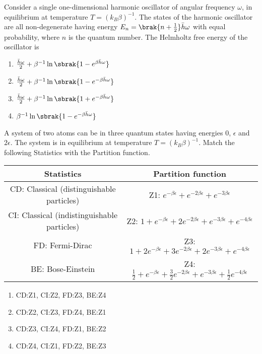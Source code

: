 \item Consider a single one-dimensional harmonic oscillator of angular frequency $\omega$, in  equilibrium at temperature $T=(k_B\beta)^{-1}$. The states of the harmonic oscillator are all non-degenerate having energy $E_n=\brak{n+\frac{1}{2}}\bar{h}\omega$ with equal probability, where $n$ is the quantum number. The Helmholtz free energy of the oscillator is

\begin{enumerate}
\item $\frac{\bar{h}\omega}{2}+\beta^{-1}\ln{\sbrak{1-e^{\beta\bar{h}\omega}}}$
\item $\frac{\bar{h}\omega}{2}+\beta^{-1}\ln{\sbrak{1-e^{-\beta\bar{h}\omega}}}$
\item $\frac{\bar{h}\omega}{2}+\beta^{-1}\ln{\sbrak{1+e^{-\beta\bar{h}\omega}}}$
\item $\beta^{-1}\ln{\sbrak{1-e^{-\beta\bar{h}\omega}}}$
\end{enumerate}

\item A system of two atoms can be in three quantum states having energies $0$, $\epsilon$ and $2\epsilon$. The system is in equilibrium at temperature $T=(k_B\beta)^{-1}$. Match the following Statistics with the Partition function.

\begin{tabular}[12pt]{ |c| c|}
    \hline
    \textbf{Statistics} & \textbf{Partition function}\\ 
    \hline
    CD: Classical (distinguishable particles) & Z1: $e^{-\beta\epsilon}+e^{-2\beta\epsilon}+e^{-3\beta\epsilon}$ \\
    \hline 
    CI: Classical (indistinguishable particles) & Z2: $1+e^{-\beta\epsilon}+2e^{-2\beta\epsilon}+e^{-3\beta\epsilon}+e^{-4\beta\epsilon}$ \\
    \hline
    FD: Fermi-Dirac & Z3: $1+2e^{-\beta\epsilon}+3e^{-2\beta\epsilon}+2e^{-3\beta\epsilon}+e^{-4\beta\epsilon}$ \\
    \hline 
    BE: Bose-Einstein & Z4: $\frac{1}{2}+e^{-\beta\epsilon}+\frac{3}{2}e^{-2\beta\epsilon}+e^{-3\beta\epsilon}+\frac{1}{2}e^{-4\beta\epsilon}$ \\
    \hline
\end{tabular}

\begin{enumerate}
\item CD:Z1, CI:Z2, FD:Z3, BE:Z4
\item CD:Z2, CI:Z3, FD:Z4, BE:Z1
\item CD:Z3, CI:Z4, FD:Z1, BE:Z2
\item CD:Z4, CI:Z1, FD:Z2, BE:Z3
\end{enumerate}

